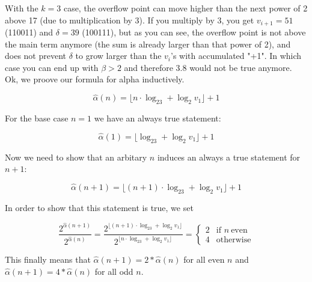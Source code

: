 \documentclass[12pt]{amsart}
\theoremstyle{definition}
\begin{document}
With the $k=3$ case, the overflow point can move higher than the next power of 2 above 17 (due to multiplication by 3). If you multiply by 3, you get $v_{i+1}=51$ (110011) and $\delta=39$ (100111), but as you can see, the overflow point is not above the main term anymore (the sum is already larger than that power of 2), and does not prevent $\delta$ to grow larger than the $v_i$'s with accumulated "+1". In which case you can end up with $\beta>2$ and therefore 3.8 would not be true anymore.
\\
Ok, we proove our formula for alpha inductively.

\[
\hat{\alpha}(n)=\lfloor n\cdot\log_23+\log_2 v_1\rfloor+1
\]

For the base case $n=1$ we have an always true statement:

\[
\hat{\alpha}(1)=\lfloor \log_23+\log_2 v_1\rfloor+1
\]

Now we need to show that an arbitary $n$ induces an always a true statement for $n+1$:

\[
\hat{\alpha}(n+1)=\lfloor (n+1)\cdot\log_23+\log_2 v_1\rfloor+1
\]

In order to show that this statement is true, we set

\[
\frac{2^{\hat\alpha(n+1)}}{2^{\hat\alpha(n)}}=\frac{2^{\lfloor (n+1)\cdot\log_23+\log_2 v_1\rfloor}}{2^{\lfloor n\cdot\log_23+\log_2 v_1\rfloor}}=\begin{cases}
2& \text{if } n~\text{even}\\
4& \text{otherwise}
\end{cases}
\]

This finally means that $\hat{\alpha}(n+1)=2*\hat{\alpha}(n)$ for all even $n$ and $\hat{\alpha}(n+1)=4*\hat{\alpha}(n)$ for all odd $n$.

\vspace{1em}


\end{document}

